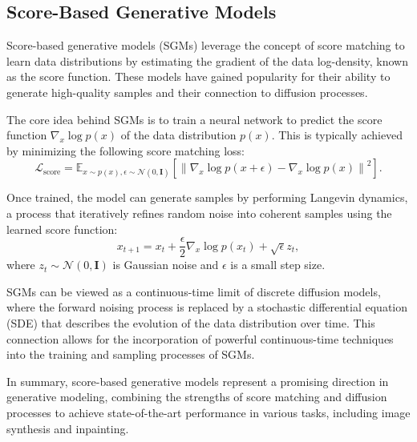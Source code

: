 \subsection{Score-Based Generative Models}
Score-based generative models (SGMs) leverage the concept of score matching to learn data distributions by estimating the gradient of the data log-density, known as the score function. These models have gained popularity for their ability to generate high-quality samples and their connection to diffusion processes.

The core idea behind SGMs is to train a neural network to predict the score function \( \nabla_{x} \log p(x) \) of the data distribution \( p(x) \). This is typically achieved by minimizing the following score matching loss:
\begin{equation}
    \mathcal{L}_{\text{score}} = \mathbb{E}_{x \sim p(x), \epsilon \sim \mathcal{N}(0, \mathbf{I})} \left[ \left\| \nabla_{x} \log p(x + \epsilon) - \nabla_{x} \log p(x) \right\|^2 \right].
\end{equation}

Once trained, the model can generate samples by performing Langevin dynamics, a process that iteratively refines random noise into coherent samples using the learned score function:
\begin{equation}
    x_{t+1} = x_t + \frac{\epsilon}{2} \nabla_{x} \log p(x_t) + \sqrt{\epsilon} z_t,
\end{equation}
where \( z_t \sim \mathcal{N}(0, \mathbf{I}) \) is Gaussian noise and \( \epsilon \) is a small step size.

SGMs can be viewed as a continuous-time limit of discrete diffusion models, where the forward noising process is replaced by a stochastic differential equation (SDE) that describes the evolution of the data distribution over time. This connection allows for the incorporation of powerful continuous-time techniques into the training and sampling processes of SGMs.

In summary, score-based generative models represent a promising direction in generative modeling, combining the strengths of score matching and diffusion processes to achieve state-of-the-art performance in various tasks, including image synthesis and inpainting.
